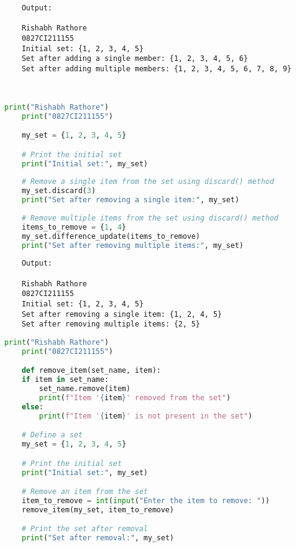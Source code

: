 \documentclass{report}
\begin{document}
\begin{verbatim}
	Output:

	Rishabh Rathore
	0827CI211155
	Initial set: {1, 2, 3, 4, 5}
	Set after adding a single member: {1, 2, 3, 4, 5, 6}
	Set after adding multiple members: {1, 2, 3, 4, 5, 6, 7, 8, 9}

	

\end{verbatim}


\newpage


\sol 
\begin{lstlisting}[language=Python]
	print("Rishabh Rathore")
	print("0827CI211155")

	my_set = {1, 2, 3, 4, 5}

	# Print the initial set
	print("Initial set:", my_set)
	
	# Remove a single item from the set using discard() method
	my_set.discard(3)
	print("Set after removing a single item:", my_set)
	
	# Remove multiple items from the set using discard() method
	items_to_remove = {1, 4}
	my_set.difference_update(items_to_remove)
	print("Set after removing multiple items:", my_set)
\end{lstlisting}

\begin{verbatim}
	Output:

	Rishabh Rathore
	0827CI211155
	Initial set: {1, 2, 3, 4, 5}
	Set after removing a single item: {1, 2, 4, 5}
	Set after removing multiple items: {2, 5}

\end{verbatim}


\newpage


\sol 
\begin{lstlisting}[language=Python]
	print("Rishabh Rathore")
	print("0827CI211155")

	def remove_item(set_name, item):
    if item in set_name:
        set_name.remove(item)
        print(f"Item '{item}' removed from the set")
    else:
        print(f"Item '{item}' is not present in the set")

	# Define a set
	my_set = {1, 2, 3, 4, 5}

	# Print the initial set
	print("Initial set:", my_set)

	# Remove an item from the set
	item_to_remove = int(input("Enter the item to remove: "))
	remove_item(my_set, item_to_remove)

	# Print the set after removal
	print("Set after removal:", my_set)
\end{lstlisting}
\end{document}
